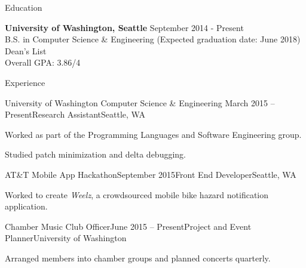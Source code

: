 \documentclass{resume} %
\begin{document}

\begin{rSection}{Education}

  {\bf University of Washington, Seattle} \hfill {September 2014 - Present} \\
  B.S. in Computer Science \& Engineering (Expected graduation date: June 2018) \\
  Dean's List \\
  Overall GPA: 3.86/4

\end{rSection}


\begin{rSection}{Experience}

  \begin{rSubsection}{University of Washington Computer Science \& Engineering}
    {March 2015 -- Present}{Research Assistant}{Seattle, WA}
  \item Worked as part of the Programming Languages and Software Engineering
    group.
  \item Studied patch minimization and delta debugging.
  \end{rSubsection}

  \begin{rSubsection}{AT\&T Mobile App Hackathon}{September 2015}{Front End Developer}{Seattle, WA}
  \item Worked to create \emph{Weelz}, a crowdsourced mobile bike hazard notification application.
  \end{rSubsection}

  \begin{rSubsection}{Chamber Music Club Officer}{June 2015 -- Present}{Project and Event Planner}{University of Washington}
  \item Arranged members into chamber groups and planned concerts quarterly.
  \end{rSubsection}
  
\end{rSection}

\end{document}
